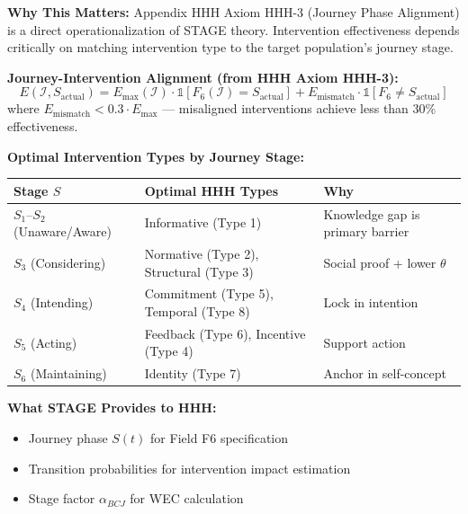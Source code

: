 \begin{tcolorbox}[colback=orange!5!white, colframe=orange!75!black,
    title=\textbf{Integration: STAGE $\leftrightarrow$ HHH (Intervention Toolkit)}]

\textbf{Why This Matters:}
Appendix HHH Axiom HHH-3 (Journey Phase Alignment) is a direct operationalization
of STAGE theory. Intervention effectiveness depends critically on matching
intervention type to the target population's journey stage.

\textbf{Journey-Intervention Alignment (from HHH Axiom HHH-3):}
\begin{equation}
E(\mathcal{I}, S_{\text{actual}}) = E_{\max}(\mathcal{I}) \cdot \mathbb{1}[F_6(\mathcal{I}) = S_{\text{actual}}] + E_{\text{mismatch}} \cdot \mathbb{1}[F_6 \neq S_{\text{actual}}]
\end{equation}
where $E_{\text{mismatch}} < 0.3 \cdot E_{\max}$ --- misaligned interventions achieve less than 30\% effectiveness.

\textbf{Optimal Intervention Types by Journey Stage:}
\begin{center}
\renewcommand{\arraystretch}{1.2}
\begin{tabular}{@{}lll@{}}
\toprule
\textbf{Stage $S$} & \textbf{Optimal HHH Types} & \textbf{Why} \\
\midrule
$S_1$--$S_2$ (Unaware/Aware) & Informative (Type 1) & Knowledge gap is primary barrier \\
$S_3$ (Considering) & Normative (Type 2), Structural (Type 3) & Social proof + lower $\theta$ \\
$S_4$ (Intending) & Commitment (Type 5), Temporal (Type 8) & Lock in intention \\
$S_5$ (Acting) & Feedback (Type 6), Incentive (Type 4) & Support action \\
$S_6$ (Maintaining) & Identity (Type 7) & Anchor in self-concept \\
\bottomrule
\end{tabular}
\end{center}

\textbf{What STAGE Provides to HHH:}
\begin{itemize}[nosep]
\item Journey phase $S(t)$ for Field F6 specification
\item Transition probabilities for intervention impact estimation
\item Stage factor $\alpha_{BCJ}$ for WEC calculation
\end{itemize}


\end{tcolorbox}
